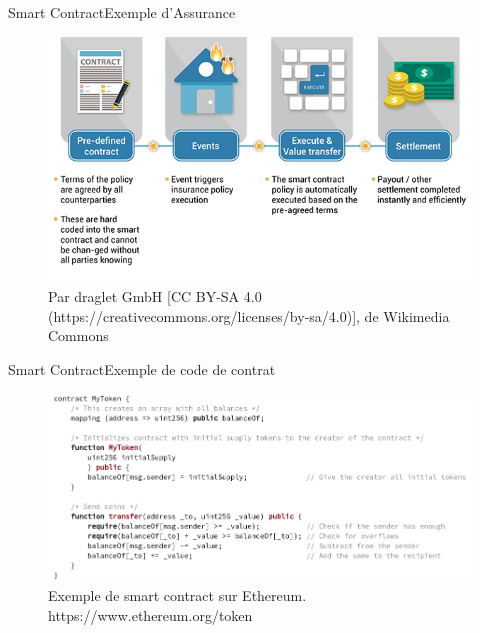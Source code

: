 \documentclass[xcolor=dvipsnames]{beamer}
\begin{document}
\begin{frame}{Smart Contract}{Exemple d'Assurance}

	\begin{figure}
		\centering
		\includegraphics[scale=.48]{insurance_contract}
		\caption{Par draglet GmbH [CC BY-SA 4.0 (https://creativecommons.org/licenses/by-sa/4.0)], de Wikimedia Commons}
	\end{figure}

\end{frame}

\begin{frame}{Smart Contract}{Exemple de code de contrat}

	\begin{figure}
		\centering
		\includegraphics[scale=.35]{contract_example}
		\caption{Exemple de smart contract sur Ethereum. https://www.ethereum.org/token}
	\end{figure}

\end{frame}
\end{document}
